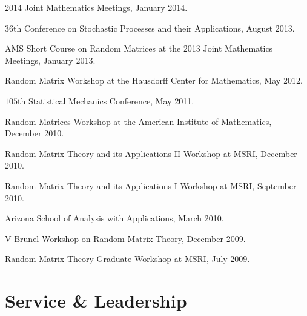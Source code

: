 \documentclass[letterpaper]{article}
\renewenvironment{itemize}{
  \begin{list}{}{
    \setlength{\leftmargin}{1em}
  }
}{
  \end{list}
}
\begin{document}
\begin{itemize}
	\item 2014 Joint Mathematics Meetings, January 2014.
	\item $36$th Conference on Stochastic Processes and their Applications, August 2013.
	\item AMS Short Course on Random Matrices at the 2013 Joint Mathematics Meetings, January 2013.
	\item Random Matrix Workshop at the Hausdorff Center for Mathematics, May 2012.
	\item $105$th Statistical Mechanics Conference, May 2011.  
	\item Random Matrices Workshop at the American Institute of Mathematics, December 2010.
	\item Random Matrix Theory and its Applications II Workshop at MSRI, December 2010.
	\item Random Matrix Theory and its Applications I Workshop at MSRI, September 2010.
	\item Arizona School of Analysis with Applications, March 2010.
	\item V Brunel Workshop on Random Matrix Theory, December 2009.
	\item Random Matrix Theory Graduate Workshop at MSRI, July 2009.
\end{itemize}


\section*{Service \& Leadership}
\end{document}

